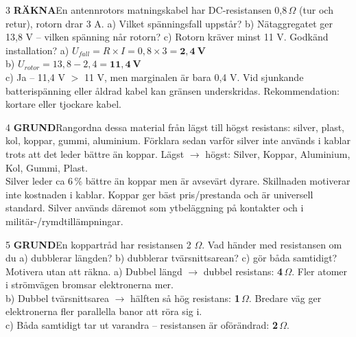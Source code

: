 \documentclass[a4paper,11pt,twoside]{book}
\newcommand{\qgrund}{\colorbox{greenpale}{\textcolor{greendark}{\headingfont\bfseries\tiny GRUND}}}
\newcommand{\qrakna}{\colorbox{bluepale}{\textcolor{bluedark}{\headingfont\bfseries\tiny RÄKNA}}}
\begin{document}
\begin{facitblock}{3}
\qrakna\quad En antennrotors matningskabel har DC-resistansen 
0,8\,$\Omega$ (tur och retur), rotorn drar 3 A. 
a) Vilket spänningsfall uppstår? b) Nätaggregatet ger 13,8 V – 
vilken spänning når rotorn? c) Rotorn kräver minst 11 V. 
Godkänd installation?
\tcblower
a) $U_{fall} = R \times I = 0{,}8 \times 3 = \mathbf{2{,}4\ \text{V}}$\\
b) $U_{rotor} = 13{,}8 - 2{,}4 = \mathbf{11{,}4\ \text{V}}$\\
c) Ja – 11,4 V $>$ 11 V, men marginalen är bara 0,4 V. Vid sjunkande 
batterispänning eller åldrad kabel kan gränsen underskridas. 
Rekommendation: kortare eller tjockare kabel.
\end{facitblock}

\newpage

\begin{facitblock}{4}
\qgrund\quad Rangordna dessa material från lägst till högst resistans: 
silver, plast, kol, koppar, gummi, aluminium. Förklara sedan varför 
silver inte används i kablar trots att det leder bättre än koppar.
\tcblower
Lägst $\rightarrow$ högst: Silver, Koppar, Aluminium, Kol, Gummi, Plast.\\
Silver leder ca 6\,\% bättre än koppar men är avsevärt dyrare. 
Skillnaden motiverar inte kostnaden i kablar. Koppar ger bäst 
pris/prestanda och är universell standard. Silver används däremot som 
ytbeläggning på kontakter och i militär-/rymdtillämpningar.
\end{facitblock}

\begin{facitblock}{5}
\qgrund\quad En koppartråd har resistansen 2 $\Omega$. Vad händer med 
resistansen om du a) dubblerar längden? b) dubblerar tvärsnittsarean? 
c) gör båda samtidigt? Motivera utan att räkna.
\tcblower
a) Dubbel längd $\rightarrow$ dubbel resistans: \textbf{4\,$\Omega$}. 
Fler atomer i strömvägen bromsar elektronerna mer.\\
b) Dubbel tvärsnittsarea $\rightarrow$ hälften så hög resistans: 
\textbf{1\,$\Omega$}. Bredare väg ger elektronerna fler parallella 
banor att röra sig i.\\
c) Båda samtidigt tar ut varandra – resistansen är oförändrad: 
\textbf{2\,$\Omega$}.
\end{facitblock}
\end{document}
